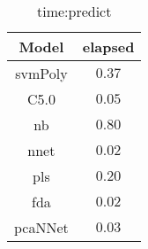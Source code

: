 \begin{table}[!ht]
	\centering
	\begin{tabular}{|c|c|}
		\hline
		Model & elapsed \\ \hline
		svmPoly & $0.37$ \\ \hline
		C5.0 & $0.05$ \\ \hline
		nb & $0.80$ \\ \hline
		nnet & $0.02$ \\ \hline
		pls & $0.20$ \\ \hline
		fda & $0.02$ \\ \hline
		pcaNNet & $0.03$ \\ \hline
	\end{tabular}
	\caption{time:predict}
	\label{tab:time:predict}
\end{table}
